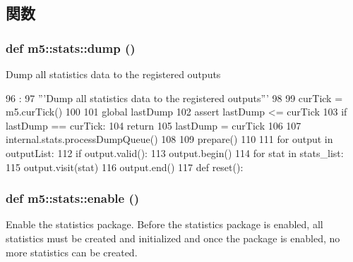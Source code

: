 \subsection{関数}
\hypertarget{namespacem5_1_1stats_a4ce2e68e958246a7a6d90428f663a6ef}{
\subsubsection[{dump}]{\setlength{\rightskip}{0pt plus 5cm}def m5::stats::dump ()}}
\label{namespacem5_1_1stats_a4ce2e68e958246a7a6d90428f663a6ef}
\begin{DoxyVerb}Dump all statistics data to the registered outputs\end{DoxyVerb}
 


\begin{DoxyCode}
96           :
97     '''Dump all statistics data to the registered outputs'''
98 
99     curTick = m5.curTick()
100 
101     global lastDump
102     assert lastDump <= curTick
103     if lastDump == curTick:
104         return
105     lastDump = curTick
106 
107     internal.stats.processDumpQueue()
108 
109     prepare()
110 
111     for output in outputList:
112         if output.valid():
113             output.begin()
114             for stat in stats_list:
115                 output.visit(stat)
116             output.end()
117 
def reset():
\end{DoxyCode}
\hypertarget{namespacem5_1_1stats_a315834bd39080d3e697f308f478779ef}{
\subsubsection[{enable}]{\setlength{\rightskip}{0pt plus 5cm}def m5::stats::enable ()}}
\label{namespacem5_1_1stats_a315834bd39080d3e697f308f478779ef}
\begin{DoxyVerb}Enable the statistics package.  Before the statistics package is
enabled, all statistics must be created and initialized and once
the package is enabled, no more statistics can be created.\end{DoxyVerb}
 


